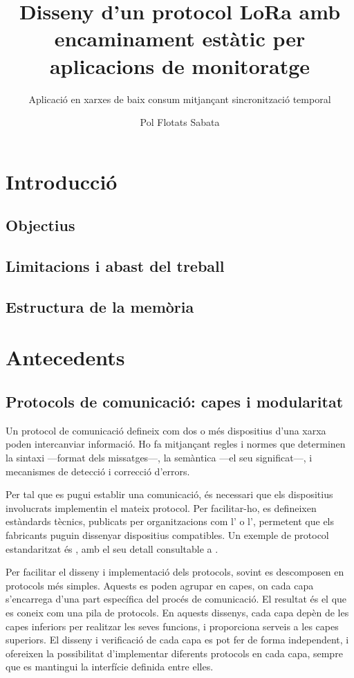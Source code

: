 \documentclass{tfgitic}[2024/07/01]
\title{Disseny d’un protocol LoRa amb encaminament estàtic per aplicacions de monitoratge}
\subtitle{Aplicació en xarxes de baix consum mitjançant sincronització temporal}
\author{Pol Flotats Sabata}
\begin{document}

\chapter{Introducció}
\section{Objectius}
\section{Limitacions i abast del treball}
\section{Estructura de la memòria}

\chapter{Antecedents}
\section{Protocols de comunicació: capes i modularitat}
Un protocol de comunicació defineix com dos o més dispositius d'una xarxa poden intercanviar informació. 
Ho fa mitjançant regles i normes que determinen la sintaxi ---format dels missatges---, la semàntica ---el seu significat---, i mecanismes
de detecció i correcció d'errors.

Per tal que es pugui establir una comunicació, és necessari que els dispositius involucrats implementin el mateix protocol. Per facilitar-ho,
es defineixen estàndards tècnics, publicats per organitzacions com l' o l', permetent que els fabricants puguin dissenyar dispositius compatibles. 
Un exemple de protocol estandaritzat és , amb el seu detall consultable a \cite{fielding_hypertext_2014}.


Per facilitar el disseny i implementació dels protocols, sovint es descomposen en protocols més simples.
Aquests es poden agrupar en capes, on cada capa s'encarrega d'una part específica del procés de comunicació. El resultat
és el que es coneix com una pila de protocols. 
En aquests dissenys, cada capa depèn de les capes inferiors per realitzar les seves funcions, i proporciona serveis a les capes superiors. 
El disseny i verificació de cada capa es pot fer de forma independent, i ofereixen la possibilitat d'implementar diferents protocols en cada capa, 
sempre que es mantingui la interfície definida entre elles.
\end{document}
